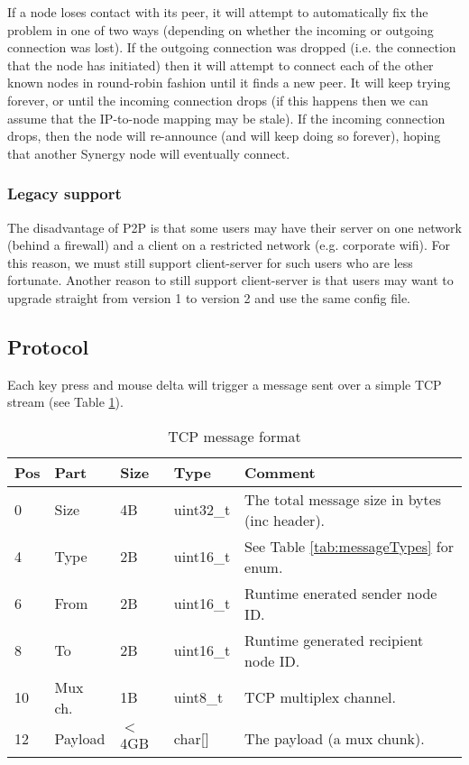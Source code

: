 If a node loses contact with its peer, it will attempt to automatically fix
the problem in one of two ways (depending on whether the incoming or outgoing 
connection was lost). If the outgoing connection was dropped (i.e. the 
connection that the node has initiated) then it will attempt to connect each 
of the other known nodes in round-robin fashion until it finds a new peer. It 
will keep trying forever, or until the incoming connection drops (if this 
happens then we can assume that the IP-to-node mapping may be stale). If
the incoming connection drops, then the node will re-announce (and will keep
doing so forever), hoping that another Synergy node will eventually connect.

\subsubsection{Legacy support}

The disadvantage of P2P is that some users may have their server on one network
(behind a firewall) and a client on a restricted network (e.g. corporate wifi).
For this reason, we must still support client-server for such users who are 
less fortunate. Another reason to still support client-server is that users may
want to upgrade straight from version 1 to version 2 and use the same config 
file.

\subsection{Protocol}

Each key press and mouse delta will trigger a message sent over a simple TCP 
stream (see Table \ref{tab:messageFormat}).

\begin{table}[ht!]
  \begin{tabular}{|l|l|l|l|l|}
    \hline
    \textbf{Pos} &
    \textbf{Part} &
    \textbf{Size} &
    \textbf{Type} &
    \textbf{Comment} \\
    \hline
    0 & Size & 4B & uint32\_t & The total message size in bytes (inc header). \\
    4 & Type & 2B & uint16\_t & See Table \ref{tab:messageTypes} for enum. \\
    6 & From & 2B & uint16\_t & Runtime enerated sender node ID. \\
    8 & To & 2B & uint16\_t & Runtime generated recipient node ID. \\
    10 & Mux ch. & 1B & uint8\_t & TCP multiplex channel. \\
    12 & Payload & $<$4GB & char[] & The payload (a mux chunk). \\
    \hline
  \end{tabular}
  \caption{TCP message format}
  \label{tab:messageFormat}
\end{table}

